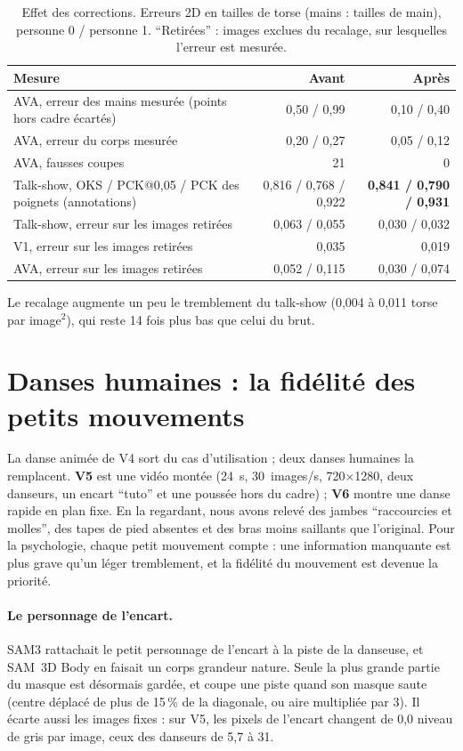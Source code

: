 \documentclass[11pt,a4paper]{report}
\newcommand{\code}[1]{\texttt{\detokenize{#1}}}
\begin{document}
\begin{table}[H]
\centering
\caption{Effet des corrections. Erreurs 2D en tailles de torse (mains : tailles de main), personne 0 / personne 1. \enquote{Retirées} :
images exclues du recalage, sur lesquelles l'erreur est mesurée.}
\label{tab:fixes}
\small
\begin{tabularx}{\textwidth}{@{}Yrr@{}}
\toprule
Mesure & Avant & Après \\
\midrule
AVA, erreur des mains mesurée (points hors cadre écartés) & 0,50 / 0,99 & 0,10 / 0,40 \\
AVA, erreur du corps mesurée & 0,20 / 0,27 & 0,05 / 0,12 \\
AVA, fausses coupes & 21 & 0 \\
Talk-show, OKS / PCK@0,05 / PCK des poignets (annotations) & 0,816 / 0,768 / 0,922 & \textbf{0,841 / 0,790 / 0,931} \\
Talk-show, erreur sur les images retirées & 0,063 / 0,055 & 0,030 / 0,032 \\
V1, erreur sur les images retirées & 0,035 & 0,019 \\
AVA, erreur sur les images retirées & 0,052 / 0,115 & 0,030 / 0,074 \\
\bottomrule
\end{tabularx}
\end{table}

Le recalage augmente un peu le tremblement du talk-show (0,004 à 0,011 torse par image$^2$), qui reste 14 fois plus bas que celui du
brut.

\section{Danses humaines : la fidélité des petits mouvements}
\label{sec:res-dance}

La danse animée de V4 sort du cas d'utilisation ; deux danses humaines la remplacent. \textbf{V5} est une vidéo montée (24~s,
30~images/s, 720$\times$1280, deux danseurs, un encart \enquote{tuto} et une poussée hors du cadre) ; \textbf{V6} montre une danse rapide en
plan fixe. En la regardant, nous avons relevé des jambes \enquote{raccourcies et molles}, des tapes de pied absentes et des bras moins
saillants que l'original. Pour la psychologie, chaque petit mouvement compte : une information manquante est plus grave qu'un léger
tremblement, et la fidélité du mouvement est devenue la priorité.

\paragraph{Le personnage de l'encart.} SAM3 rattachait le petit personnage de l'encart à la piste de la danseuse, et SAM~3D Body en
faisait un corps grandeur nature. Seule la plus grande partie du masque est désormais gardée, et \code{people_from_tracks.py} coupe une
piste quand son masque saute (centre déplacé de plus de 15\,\% de la diagonale, ou aire multipliée par 3). Il écarte aussi les images
fixes : sur V5, les pixels de l'encart changent de 0,0 niveau de gris par image, ceux des danseurs de 5,7 à 31.
\end{document}
